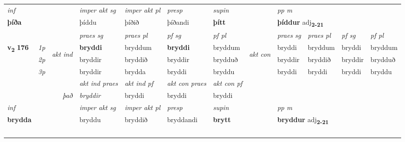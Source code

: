 \begin{longtable}[l]{X>{\footnotesize\itshape}llXXXXlXXXX}
\cmidrule{4-7}
   {\textit{inf}} & &  & \textit{imper akt sg} & \textit{imper akt pl}   & \textit{presp} & \textit{supin}  && \textit{pp m} \\*
  {\textbf{þíða}} & && þíddu  & þíðið   & þíðandi &  \textbf{þítt}  && \multicolumn{2}{l}{\textbf{þíddur} adj\textbf{\textsubscript{2-21}}} \\*

\midrule

 & &   & \textit{praes sg}  & \textit{praes pl}    & \textit{ pf sg} & \textit{pf pl} & & \textit{praes sg}  & \textit{praes pl}    & \textit{pf sg} & \textit{pf pl }  \\ \cmidrule{4-7} \cmidrule{9-12}
 \multirow{2}{*}{{{\textbf{v{\textsubscript{2}}} \Large{\textbf{176}}}}}  & 1p & \multirow{3}{*}{\begin{turn}{90}\textit{akt ind}\end{turn}} & \textbf{bryddi} & bryddum & \textbf{bryddi} & bryddum & \multirow{3}{*}{\begin{turn}{90}\textit{akt con}\end{turn}} &bryddi & bryddum & bryddi & bryddum\\*
 & 2p &  &  bryddir  & bryddið & bryddir & brydduð & & bryddir & bryddið & bryddir & brydduð \\*
 & 3p &  & bryddir & brydda & bryddi & bryddu & & bryddi & bryddi& bryddi & bryddu \\*
\cmidrule{4-7} \cmidrule{9-12}

   && &  \textit{akt ind praes} & \textit{akt ind pf} & \textit{akt con praes} & \textit{akt con pf} \\*
\multicolumn{3}{r}{\textit{það}} & bryddir & bryddi & bryddi & bryddi \\*

\cmidrule{4-7}
   {\textit{inf}} & &  & \textit{imper akt sg} & \textit{imper akt pl}   & \textit{presp} & \textit{supin}  && \textit{pp m} \\*
  {\textbf{brydda}} & && bryddu  & bryddið   & bryddandi &  \textbf{brytt}  && \multicolumn{2}{l}{\textbf{bryddur} adj\textbf{\textsubscript{2-21}}} \\*

\midrule
  & \\*
    & \\*
   & \\*
  & \\
   \midrule


\end{longtable}
